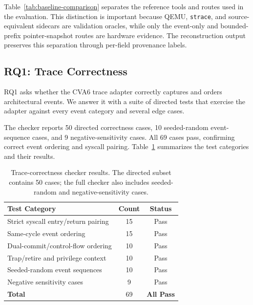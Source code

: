 

Table~\ref{tab:baseline-comparison} separates the reference tools and \rvmt
routes used in the evaluation. This distinction is important because QEMU,
\texttt{strace}, and source-equivalent sidecars are validation oracles, while
only the event-only and bounded-prefix pointer-snapshot routes are hardware
evidence. The reconstruction output preserves this separation through
per-field provenance labels.



\subsection{RQ1: Trace Correctness}
\label{subsec:rq1-trace-correctness}

RQ1 asks whether the CVA6 trace adapter correctly captures and orders architectural events. We answer it with a suite of directed tests that exercise the adapter against every event category and several edge cases.

The checker reports 50 directed correctness cases, 10 seeded-random
event-sequence cases, and 9 negative-sensitivity cases. All 69 cases pass,
confirming correct event ordering and syscall pairing. Table~\ref{tab:trace-correctness}
summarizes the test categories and their results.

\begin{table}[t]
\centering
\small
\begin{tabular}{lcc}
\toprule
\textbf{Test Category} & \textbf{Count} & \textbf{Status} \\
\midrule
Strict syscall entry/return pairing & 15 & Pass \\
Same-cycle event ordering & 15 & Pass \\
Dual-commit/control-flow ordering & 10 & Pass \\
Trap/retire and privilege context & 10 & Pass \\
Seeded-random event sequences & 10 & Pass \\
Negative sensitivity cases & 9 & Pass \\
\midrule
\textbf{Total} & 69 & \textbf{All Pass} \\
\bottomrule
\end{tabular}
\caption{Trace-correctness checker results. The directed subset contains 50
cases; the full checker also includes seeded-random and negative-sensitivity
cases.}
\label{tab:trace-correctness}
\end{table}

